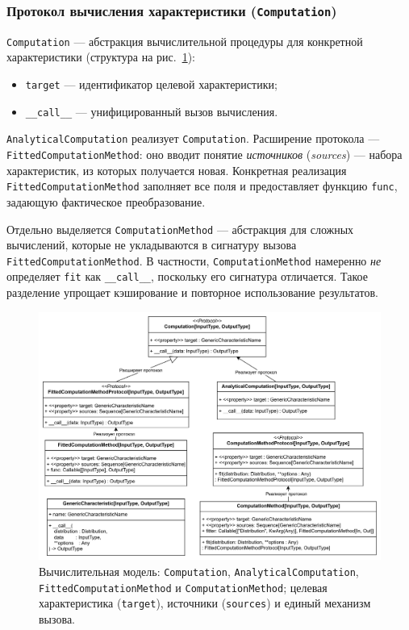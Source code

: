 \subsubsection{Протокол вычисления характеристики (\texttt{Computation})}

\texttt{Computation} — абстракция вычислительной процедуры для конкретной характеристики (структура на рис.~\ref{fig:uml-computation}):
\begin{itemize}
  \item \texttt{target} — идентификатор целевой характеристики;
  \item \texttt{\_\_call\_\_} — унифицированный вызов вычисления.
\end{itemize}
\texttt{AnalyticalComputation} реализует \texttt{Computation}. Расширение протокола — \texttt{FittedComputationMethod}: оно вводит понятие \emph{источников} (\emph{sources}) — набора характеристик, из которых получается новая. Конкретная реализация \texttt{FittedComputationMethod} заполняет все поля и предоставляет функцию \texttt{func}, задающую фактическое преобразование.

Отдельно выделяется \texttt{ComputationMethod} — абстракция для сложных вычислений, которые не укладываются в сигнатуру вызова \texttt{FittedComputationMethod}. В частности, \texttt{ComputationMethod} намеренно \emph{не} определяет \texttt{fit} как \texttt{\_\_call\_\_}, поскольку его сигнатура отличается. Такое разделение упрощает кэширование и повторное использование результатов.

\begin{figure}[h]
  \centering
  \includegraphics[width=.66\linewidth,trim=4mm 4mm 4mm 4mm,clip]{assets/images/Computation.png}
  \caption{Вычислительная модель: \texttt{Computation}, \texttt{AnalyticalComputation},
  \texttt{FittedComputationMethod} и \texttt{ComputationMethod}; целевая характеристика (\texttt{target}),
  источники (\texttt{sources}) и единый механизм вызова.}
  \label{fig:uml-computation}
\end{figure}

